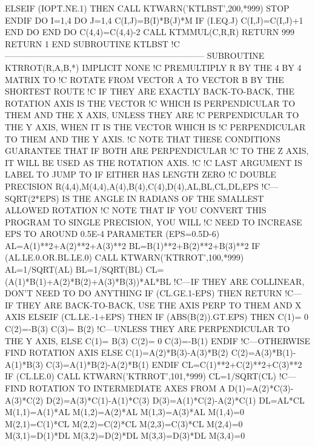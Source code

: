       ELSEIF (IOPT.NE.1) THEN
        CALL KTWARN('KTLBST',200,*999)
        STOP
      ENDIF
      DO I=1,4
         DO J=1,4
            C(I,J)=B(I)*B(J)*M
            IF (I.EQ.J) C(I,J)=C(I,J)+1
         END DO
      END DO
      C(4,4)=C(4,4)-2
      CALL KTMMUL(C,R,R)
      RETURN
999   RETURN 1
    END SUBROUTINE KTLBST
!C-----------------------------------------------------------------------
    SUBROUTINE KTRROT(R,A,B,*)
      IMPLICIT NONE
!C   PREMULTIPLY R BY THE 4 BY 4 MATRIX TO
!C   ROTATE FROM VECTOR A TO VECTOR B BY THE SHORTEST ROUTE
!C   IF THEY ARE EXACTLY BACK-TO-BACK, THE ROTATION AXIS IS THE VECTOR
!C   WHICH IS PERPENDICULAR TO THEM AND THE X AXIS, UNLESS THEY ARE
!C   PERPENDICULAR TO THE Y AXIS, WHEN IT IS THE VECTOR WHICH IS
!C   PERPENDICULAR TO THEM AND THE Y AXIS.
!C   NOTE THAT THESE CONDITIONS GUARANTEE THAT IF BOTH ARE PERPENDICULAR
!C   TO THE Z AXIS, IT WILL BE USED AS THE ROTATION AXIS.
!C
!C   LAST ARGUMENT IS LABEL TO JUMP TO IF EITHER HAS LENGTH ZERO
!C
      DOUBLE PRECISION R(4,4),M(4,4),A(4),B(4),C(4),D(4),AL,BL,CL,DL,EPS
!C---SQRT(2*EPS) IS THE ANGLE IN RADIANS OF THE SMALLEST ALLOWED ROTATION
!C   NOTE THAT IF YOU CONVERT THIS PROGRAM TO SINGLE PRECISION, YOU WILL
!C   NEED TO INCREASE EPS TO AROUND 0.5E-4
      PARAMETER (EPS=0.5D-6)
      AL=A(1)**2+A(2)**2+A(3)**2
      BL=B(1)**2+B(2)**2+B(3)**2
      IF (AL.LE.0.OR.BL.LE.0) CALL KTWARN('KTRROT',100,*999)
      AL=1/SQRT(AL)
      BL=1/SQRT(BL)
      CL=(A(1)*B(1)+A(2)*B(2)+A(3)*B(3))*AL*BL
!C---IF THEY ARE COLLINEAR, DON'T NEED TO DO ANYTHING
      IF (CL.GE.1-EPS) THEN
         RETURN
!C---IF THEY ARE BACK-TO-BACK, USE THE AXIS PERP TO THEM AND X AXIS
      ELSEIF (CL.LE.-1+EPS) THEN
         IF (ABS(B(2)).GT.EPS) THEN
            C(1)= 0
            C(2)=-B(3)
            C(3)= B(2)
!C---UNLESS THEY ARE PERPENDICULAR TO THE Y AXIS,
         ELSE
            C(1)= B(3)
            C(2)= 0
            C(3)=-B(1)
         ENDIF
!C---OTHERWISE FIND ROTATION AXIS
      ELSE
         C(1)=A(2)*B(3)-A(3)*B(2)
         C(2)=A(3)*B(1)-A(1)*B(3)
         C(3)=A(1)*B(2)-A(2)*B(1)
      ENDIF
      CL=C(1)**2+C(2)**2+C(3)**2
      IF (CL.LE.0) CALL KTWARN('KTRROT',101,*999)
      CL=1/SQRT(CL)
!C---FIND ROTATION TO INTERMEDIATE AXES FROM A
      D(1)=A(2)*C(3)-A(3)*C(2)
      D(2)=A(3)*C(1)-A(1)*C(3)
      D(3)=A(1)*C(2)-A(2)*C(1)
      DL=AL*CL
      M(1,1)=A(1)*AL
      M(1,2)=A(2)*AL
      M(1,3)=A(3)*AL
      M(1,4)=0
      M(2,1)=C(1)*CL
      M(2,2)=C(2)*CL
      M(2,3)=C(3)*CL
      M(2,4)=0
      M(3,1)=D(1)*DL
      M(3,2)=D(2)*DL
      M(3,3)=D(3)*DL
      M(3,4)=0
